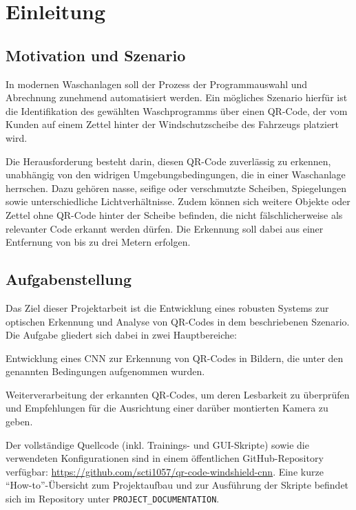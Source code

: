 \chapter{Einleitung}
\label{ch:einleitung}

\section{Motivation und Szenario}
\label{sec:motivation}
In modernen Waschanlagen soll der Prozess der Programmauswahl und Abrechnung zunehmend automatisiert werden. Ein mögliches Szenario hierfür ist die Identifikation des gewählten Waschprogramms über einen \ac{QR}-Code, der vom Kunden auf einem Zettel hinter der Windschutzscheibe des Fahrzeugs platziert wird.

Die Herausforderung besteht darin, diesen \ac{QR}-Code zuverlässig zu erkennen, unabhängig von den widrigen Umgebungsbedingungen, die in einer Waschanlage herrschen. Dazu gehören nasse, seifige oder verschmutzte Scheiben, Spiegelungen sowie unterschiedliche Lichtverhältnisse. Zudem können sich weitere Objekte oder Zettel ohne \ac{QR}-Code hinter der Scheibe befinden, die nicht fälschlicherweise als relevanter Code erkannt werden dürfen. Die Erkennung soll dabei aus einer Entfernung von bis zu drei Metern erfolgen.

\section{Aufgabenstellung}
\label{sec:aufgabenstellung}
Das Ziel dieser Projektarbeit ist die Entwicklung eines robusten Systems zur optischen Erkennung und Analyse von \ac{QR}-Codes in dem beschriebenen Szenario. Die Aufgabe gliedert sich dabei in zwei Hauptbereiche:
\begin{listArab}
    \item Entwicklung eines \ac{CNN} zur Erkennung von \ac{QR}-Codes in Bildern, die unter den genannten Bedingungen aufgenommen wurden.
    \item Weiterverarbeitung der erkannten \ac{QR}-Codes, um deren Lesbarkeit zu überprüfen und Empfehlungen für die Ausrichtung einer darüber montierten Kamera zu geben.
\end{listArab}

Der vollständige Quellcode (inkl. Trainings- und GUI-Skripte) sowie die verwendeten Konfigurationen
sind in einem öffentlichen GitHub-Repository verfügbar: \url{https://github.com/scti1057/qr-code-windshield-cnn}.
Eine kurze “How-to”-Übersicht zum Projektaufbau und zur Ausführung der Skripte befindet sich im Repository
unter \texttt{PROJECT\_DOCUMENTATION}.

